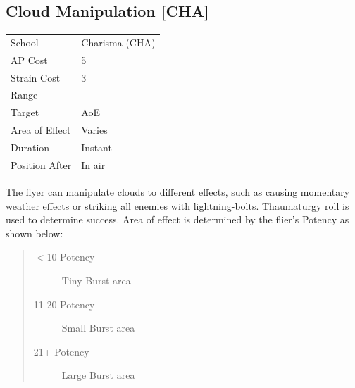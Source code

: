 \documentclass[11pt,a4paper,twocolumn]{book}
\begin{document}


\subsection*{Cloud Manipulation [CHA]}
{
	\begin{tabu} to 75mm{| X[l,4] | X[l,7] |}
		\hline
		School 			& Charisma (CHA) 	\\
        AP Cost	      	& 5 				\\
        Strain Cost     & 3 				\\
        Range     		& - 				\\
        Target      	& AoE 				\\
        Area of Effect  & Varies 			\\
        Duration     	& Instant 			\\
		Position After  & In air 			\\ \hline
	\end{tabu}
		
}

\medskip
The flyer can manipulate clouds to different effects, such as causing momentary weather effects or striking all enemies with lightning-bolts. Thaumaturgy roll is used to determine success. Area of effect is determined by the flier's Potency as shown below: 

%
\begin{quote}
  \begin{description}
    \item[$<$10 Potency] 	Tiny Burst area
    \item[11-20 Potency] 	Small Burst area
    \item[21+ Potency] 	Large Burst area
  \end{description}
\end{quote}
\end{document}
